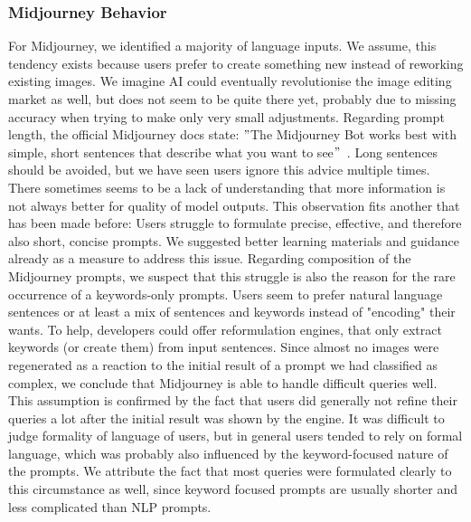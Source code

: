 \subsubsection{Midjourney Behavior}
For Midjourney, we identified a majority of language inputs.
We assume, this tendency exists because users prefer to create something new instead
of reworking existing images.
We imagine AI could eventually revolutionise the image editing market as well, but does not seem
to be quite there yet, probably due to missing accuracy when trying to make only very small
adjustments.
Regarding prompt length, the official Midjourney docs state: \("\)The Midjourney Bot works best with
simple, short sentences that describe what you want to see\("\)~\cite{midjourney_documentation_2023}.
Long sentences should be avoided, but we have seen users ignore this advice multiple times.
There sometimes seems to be a lack of understanding that more information is not
always better for quality of model outputs.
This observation fits another that has been made before:
Users struggle to formulate precise, effective, and therefore also short, concise prompts.
We suggested better learning materials and guidance already as a measure to address this issue.
Regarding composition of the Midjourney prompts, we suspect that this struggle is also the reason
for the rare occurrence of a keywords-only prompts.
Users seem to prefer natural language sentences or at least a mix of sentences and keywords
instead of "encoding" their wants.
To help, developers could offer reformulation engines, that only extract keywords (or create them)
from input sentences.
Since almost no images were regenerated as a reaction to the initial result of a prompt
we had classified as complex, we conclude that Midjourney is able to handle difficult queries well.
This assumption is confirmed by the fact that users did generally not refine their queries a lot
after the initial result was shown by the engine.
It was difficult to judge formality of language of users, but in general users tended to rely on
formal language, which was probably also influenced by the keyword-focused nature of the prompts.
We attribute the fact that most queries were formulated clearly to this circumstance as well,
since keyword focused prompts are usually shorter and less complicated than NLP prompts.

